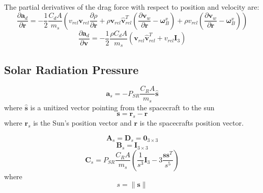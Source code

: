 The partial derivatives of the drag force with respect to position and velocity are:
%
\begin{equation}
   \frac{\partial \mathbf{a}_d }{\partial \mathbf{r}} = -\frac{1}{2}\frac{C_d A}{m_s}\left( v_{rel}\mathbf{v}_{rel}\frac{\partial \rho}{\partial \mathbf{r}} + \rho \mathbf{v}_{rel}\hat{\mathbf{v}}_{rel}^T \left(\frac{\partial \mathbf{v}_{w}}{\partial \mathbf{r}}  - \boldsymbol{\omega}_B^{x}\right) +
   \rho v_{rel} \left( \frac{ \partial \mathbf{v}_w}{\partial \mathbf{r}} - \boldsymbol{\omega}_B^{x} \right)\right)
\end{equation}
%
\begin{equation}
    \frac{\partial \mathbf{a}_d }{\partial \mathbf{v}} = -\frac{1}{2}\frac{\rho C_d A}{m_s}\left(  \mathbf{v}_{rel}\hat{\mathbf{v}}_{rel}^T + v_{rel}\mathbf{I}_3\right)
\end{equation}
%
%


\subsection{Solar Radiation Pressure}

\begin{equation}
     \mathbf{a}_s = -P_{SR}\displaystyle\frac{   C_R A    }{m_s}\hat{\mathbf{s}}
\end{equation}
%
where $\hat{\mathbf{s}}$ is a unitized vector pointing from the
spacecraft to the sun
%
\begin{equation}
    \mathbf{s} = \mathbf{r}_s - \mathbf{r}
\end{equation}
%
where $\mathbf{r}_s$ is the Sun's position vector and $\mathbf{r}$
is the spacecrafts position vector.



\begin{equation}
    \mathbf{A}_{s} = \mathbf{D}_{s}  = \mathbf{0}_{3\times3}
\end{equation}
%
\begin{equation}
    \mathbf{B}_{s} = \mathbf{I}_{3\times3}
\end{equation}
%
\begin{equation}
    \mathbf{C}_{s} = P_{SR}\displaystyle\frac{   C_R A
    }{m_s}\left( \frac{1}{s^3}\mathbf{I}_3 - 3 \frac{ \mathbf{s}\mathbf{s}^T}{s^5}\right)
\end{equation}
%
where
%
\begin{equation}
    s = \| \mathbf{s} \|
\end{equation}

